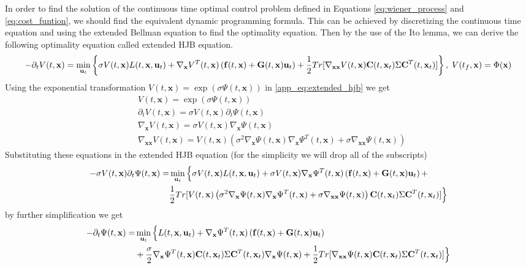 \documentclass[letterpaper, 10 pt, conference]{ieeeconf}
\newcommand{\vf}{\mathbf f}
\newcommand{\vu}{\mathbf u}
\newcommand{\vx}{\mathbf x}
\newcommand{\vC}{\mathbf C}
\newcommand{\vG}{\mathbf G}
\begin{document}
In order to find the solution of the continuous time optimal control problem
defined in Equations \eqref{eq:wiener_process} and \eqref{eq:cost_funtion}, we
should find the equivalent dynamic programming formula. This can be achieved by
discretizing the continuous time equation and using the extended Bellman equation
to find the optimality equation. Then by the use of the Ito lemma, we can derive the
following optimality equation called extended HJB equation.
\begin{equation} \label{app_eq:extended_hjb}
-\partial_t V(t,\vx) = \min\limits_{\vu_t} \left\{ \sigma V(t,\vx) L(t,\vx,\vu_t) + 
\nabla_{\vx}V^{T}(t,\vx) \left( \vf(t,\vx)+\vG(t,\vx)\vu_t \right) + \frac{1}{2} Tr [\nabla_{\vx\vx}V(t,\vx) \vC(t,\vx_t) \Sigma \vC^T(t,\vx_t)] \right\}, \hspace{1mm} V(t_f,\vx) = \Phi(\vx) 
\end{equation}
Using the exponential transformation $V(t,\vx) = \exp(\sigma \Psi(t,\vx))$ in \eqref{app_eq:extended_hjb} we get
\begin{align}
& V(t,\vx) = \exp(\sigma \Psi(t,\vx)) \\
&\partial_t V(t,\vx) = \sigma V(t,\vx) \partial_t \Psi(t,\vx) \\
&\nabla_{\vx}V(t,\vx) = \sigma V(t,\vx) \nabla_{\vx}\Psi(t,\vx) \\
&\nabla_{\vx\vx}V(t,\vx) =  V(t,\vx) \left( \sigma^2 \nabla_{\vx}\Psi(t,\vx)\nabla_{\vx}\Psi^T(t,\vx) + \sigma \nabla_{\vx\vx}\Psi(t,\vx) \right)
\end{align}
Substituting these equations in the extended HJB equation (for the simplicity we
will drop all of the subscripts)
\begin{align}
-\sigma V(t,\vx) \partial_t \Psi(t,\vx) =& \min\limits_{\vu_t} \Big\{ \sigma V(t,\vx) L(t,\vx,\vu_t) + 
\sigma V(t,\vx) \nabla_{\vx}\Psi^T(t,\vx) \left( \vf(t,\vx)+\vG(t,\vx)\vu_t \right) + \notag \\ 
&\frac{1}{2} Tr [ V(t,\vx) \left( \sigma^2 \nabla_{\vx}\Psi(t,\vx)\nabla_{\vx}\Psi^T(t,\vx) + \sigma \nabla_{\vx\vx}\Psi(t,\vx) \right) \vC(t,\vx_t) \Sigma \vC^T(t,\vx_t)] \Big\} 
\end{align}
by further simplification we get
\begin{align}
-\partial_t \Psi(t,\vx) =& \min\limits_{\vu_t} \Big\{ L(t,\vx,\vu_t) + \nabla_{\vx}\Psi^T(t,\vx) \left( \vf(t,\vx)+\vG(t,\vx)\vu_t \right) \notag \\ 
& + \frac{\sigma}{2} \nabla_{\vx}\Psi^T(t,\vx) \vC(t,\vx_t)\Sigma \vC^T(t,\vx_t) \nabla_{\vx}\Psi(t,\vx) + \frac{1}{2} Tr [\nabla_{\vx\vx}\Psi(t,\vx) \vC(t,\vx_t) \Sigma \vC^T(t,\vx_t)] \Big\} 
\end{align}
\end{document}
